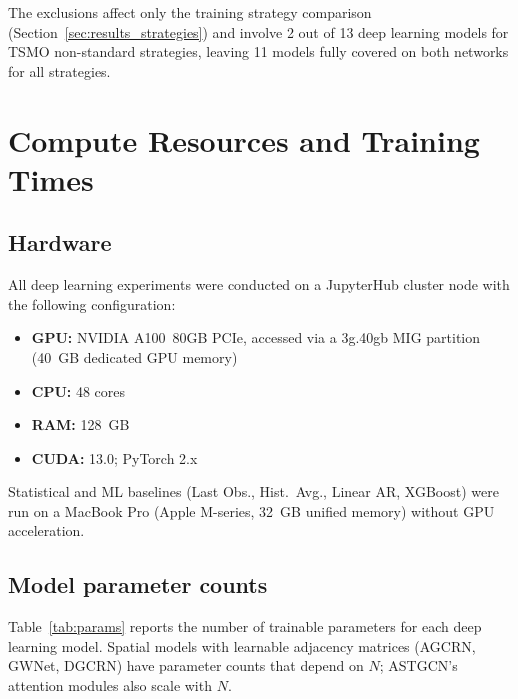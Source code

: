 \documentclass[a4paper]{cas-sc}
\begin{document}
The exclusions affect only the training strategy comparison
(Section~\ref{sec:results_strategies}) and involve 2 out of 13
deep learning models for TSMO non-standard strategies,
leaving 11 models fully covered on both networks for all strategies.

\section{Compute Resources and Training Times}
\label{app:compute}

\subsection{Hardware}

All deep learning experiments were conducted on a JupyterHub cluster
node with the following configuration:
\begin{itemize}
  \item \textbf{GPU:} NVIDIA A100~80GB PCIe, accessed via a
        3g.40gb MIG partition (40~GB dedicated GPU memory)
  \item \textbf{CPU:} 48 cores
  \item \textbf{RAM:} 128~GB
  \item \textbf{CUDA:} 13.0; PyTorch 2.x
\end{itemize}

Statistical and ML baselines (Last Obs., Hist.\ Avg., Linear AR,
XGBoost) were run on a MacBook Pro (Apple M-series, 32~GB unified
memory) without GPU acceleration.

\subsection{Model parameter counts}

Table~\ref{tab:params} reports the number of trainable parameters
for each deep learning model.
Spatial models with learnable adjacency matrices (AGCRN, GWNet,
DGCRN) have parameter counts that depend on $N$;
ASTGCN's attention modules also scale with $N$.
\end{document}
